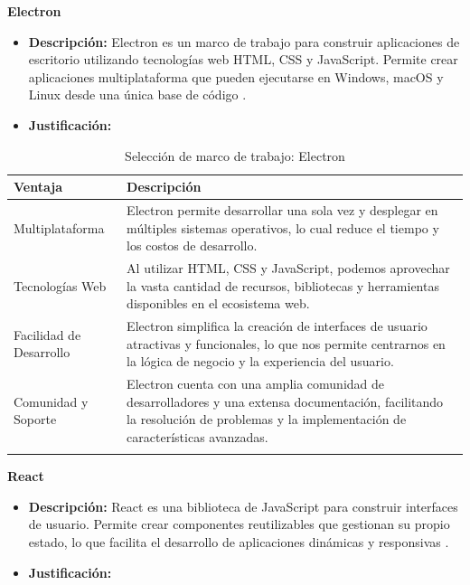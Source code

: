 \textbf{Electron}
\begin{itemize}[label={}, leftmargin=0pt]
    \item \textbf{Descripción:} Electron es un marco de trabajo para construir aplicaciones de escritorio utilizando tecnologías web HTML, CSS y JavaScript. Permite crear aplicaciones multiplataforma que pueden ejecutarse en Windows, macOS y Linux desde una única base de código \cite{electron_website}.
    \item \textbf{Justificación:}
\end{itemize}

\begin{longtable}{|p{3cm}|p{10cm}|}
\hline
\textbf{Ventaja} & \textbf{Descripción} \\ \hline
Multiplataforma & Electron permite desarrollar una sola vez y desplegar en múltiples sistemas operativos, lo cual reduce el tiempo y los costos de desarrollo. \\ \hline
Tecnologías Web & Al utilizar HTML, CSS y JavaScript, podemos aprovechar la vasta cantidad de recursos, bibliotecas y herramientas disponibles en el ecosistema web. \\ \hline
Facilidad de Desarrollo & Electron simplifica la creación de interfaces de usuario atractivas y funcionales, lo que nos permite centrarnos en la lógica de negocio y la experiencia del usuario. \\ \hline
Comunidad y Soporte & Electron cuenta con una amplia comunidad de desarrolladores y una extensa documentación, facilitando la resolución de problemas y la implementación de características avanzadas. \\ \hline
\caption{Selección de marco de trabajo: Electron}
\end{longtable}

\textbf{React}
\begin{itemize}[label={}, leftmargin=0pt]
    \item \textbf{Descripción:} React es una biblioteca de JavaScript para construir interfaces de usuario. Permite crear componentes reutilizables que gestionan su propio estado, lo que facilita el desarrollo de aplicaciones dinámicas y responsivas \cite{react_website}.
    \item \textbf{Justificación:}
\end{itemize}

